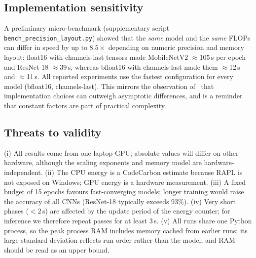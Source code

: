 \documentclass[conference]{IEEEtran}
\begin{document}
\subsection{Implementation sensitivity}
A preliminary micro-benchmark (supplementary script \texttt{bench\_precision\_\allowbreak layout.py}) showed that the \emph{same} model and the
\emph{same} FLOPs can differ in speed by up to $8.5\times$ depending on numeric precision and memory layout:
float16 with channels-last tensors made MobileNetV2 $\approx$105\,s per epoch and ResNet-18 $\approx$39\,s, whereas
bfloat16 with channels-last made them $\approx$12\,s and $\approx$11\,s. All reported experiments use the fastest configuration for every model (bfloat16,
channels-last). This mirrors the observation of~\cite{akpinar2026dc} that implementation choices can outweigh
asymptotic differences, and is a reminder that constant factors are part of practical complexity.

\subsection{Threats to validity}
(i) All results come from one laptop GPU; absolute values will differ on other hardware, although the scaling
exponents and memory model are hardware-independent. (ii) The CPU energy is a CodeCarbon estimate because RAPL is
not exposed on Windows; GPU energy is a hardware measurement. (iii) A fixed budget of 15 epochs favours fast-converging
models; longer training would raise the accuracy of all CNNs (ResNet-18 typically exceeds 93\%). (iv) Very short
phases ($<2$\,s) are affected by the update period of the energy counter; for inference we therefore repeat passes
for at least 3\,s. (v) All runs share one Python process, so the peak process RAM includes memory cached from
earlier runs; its large standard deviation reflects run order rather than the model, and RAM should be read as an
upper bound.

\end{document}
